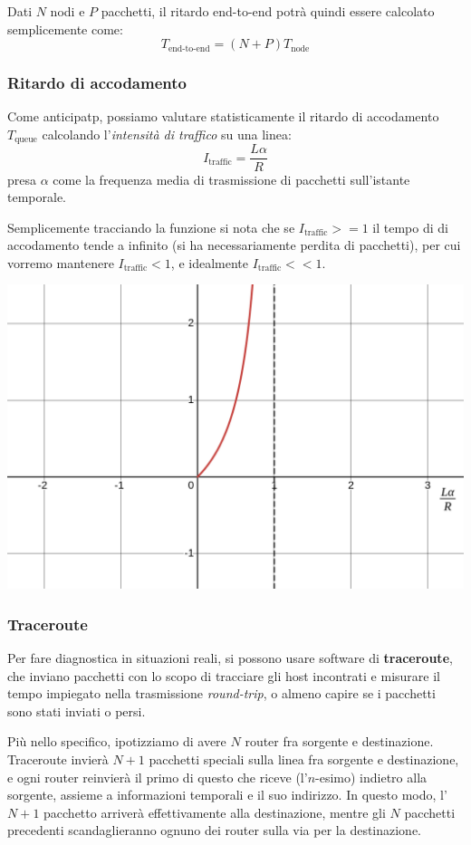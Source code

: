 \documentclass[a4paper,11pt]{article}
\begin{document}
Dati $N$ nodi e $P$ pacchetti, il ritardo end-to-end potrà quindi essere calcolato semplicemente come:
$$
T_{\text{end-to-end}} = (N + P) T_{\text{node}}
$$

\subsubsection{Ritardo di accodamento}
Come anticipatp, possiamo valutare statisticamente il ritardo di accodamento $T_{\text{queue}}$ calcolando l'\textit{intensità di traffico} su una linea:
$$
I_{\text{traffic}} = \frac{L \alpha}{R}
$$
presa $\alpha$ come la frequenza media di trasmissione di pacchetti sull'istante temporale.

Semplicemente tracciando la funzione si nota che se $I_{\text{traffic}} >= 1$ il tempo di di accodamento tende a infinito (si ha necessariamente perdita di pacchetti), per cui vorremo mantenere $I_{\text{traffic}} < 1$, e idealmente $I_{\text{traffic}} << 1$.

\begin{center}
	\includegraphics[scale=0.3]{../figures/traf_intensity.png}
\end{center}

\subsubsection{Traceroute}
Per fare diagnostica in situazioni reali, si possono usare software di \textbf{traceroute}, che inviano pacchetti con lo scopo di tracciare gli host incontrati e misurare il tempo impiegato nella trasmissione \textit{round-trip}, o almeno capire se i pacchetti sono stati inviati o persi.

Più nello specifico, ipotizziamo di avere $N$ router fra sorgente e destinazione.
Traceroute invierà $N + 1$ pacchetti speciali sulla linea fra sorgente e destinazione, e ogni router reinvierà il primo di questo che riceve (l'$n$-esimo) indietro alla sorgente, assieme a informazioni temporali e il suo indirizzo.
In questo modo, l'$N + 1$ pacchetto arriverà effettivamente alla destinazione, mentre gli $N$ pacchetti precedenti scandaglieranno ognuno dei router sulla via per la destinazione.
\end{document}
